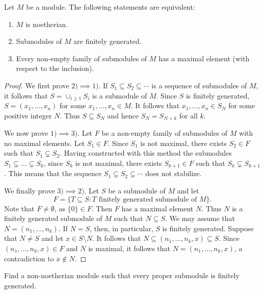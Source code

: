 \begin{proposition}
Let $M$ be a module. The following statements are equivalent:
\begin{enumerate}
\item $M$ is noetherian.
\item Submodules of $M$ are finitely generated.
\item Every non-empty family of submodules of $M$ has a maximal element (with respect to the inclusion).	
\end{enumerate}
\end{proposition}

\begin{proof}
	We first prove $2)\implies1)$. If $S_1\subseteq S_2\subseteq\cdots$ is a sequence of submodules of $M$, 
	it follows that $S=\cup_{i\geq 1}S_i$ is a submodule of $M$. Since $S$ is finitely generated, 
	$S=(x_1,\dots,x_n)$ for some $x_1,\dots,x_n\in M$. It follows that 
	$x_1,\dots,x_n\in S_N$ for some positive integer $N$. Thus 
	$S\subseteq S_N$ and hence $S_N=S_{N+k}$ for all $k$. 
	
	We now prove $1)\implies3)$. Let $F$ be a non-empty family of submodules of $M$ with no maximal elements. 
	Let $S_1\in F$. Since $S_1$ is not maximal, there exists $S_2\in F$ such that $S_1\subsetneq S_2$. 
	Having constructed with this method the submodules $S_1\subsetneq\dots\subsetneq S_k$, since $S_k$ is not
	maximal, there exists $S_{k+1}\in F$ such that $S_k\subsetneq S_{k+1}$. 
	This means that the sequence 
	$S_1\subsetneq S_2\subsetneq\cdots$ does not stabilize. 
	
	We finally prove $3)\implies2)$. Let $S$ be a submodule of $M$ and let 
	\[
	F=\{T\subseteq S:T\text{ finitely generated submodule of $M$}\}.
	\]
	Note that $F\ne\emptyset$, as $\{0\}\in F$. 
	Then $F$ has a maximal element $N$. Thus
	$N$ is a finitely generated submodule of $M$ such that $N\subseteq S$. We may assume that 
	$N=(n_1,\dots,n_k)$. If $N=S$, then, in particular, $S$ is finitely generated. Suppose that
	$N\ne S$ and let $x\in S\setminus N$. It follows that  
	$N\subseteq (n_1,\dots,n_k,x)\subseteq S$. Since 
	$(n_1,\dots,n_k,x)\in F$ and $N$ is maximal, it follows that 
	$N=(n_1,\dots,n_k,x)$, a contradiction
	to $x\not\in N$. 
\end{proof}

\begin{exercise}
\label{xca:Pruffer}
Find a non-noetherian module such that every proper submodule is finitely generated. 	
\end{exercise}

